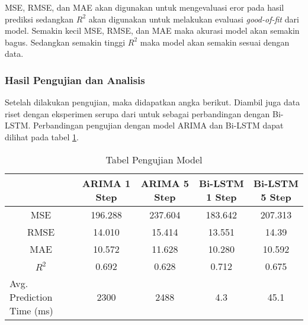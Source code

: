 MSE, RMSE, dan MAE akan digunakan untuk mengevaluasi eror pada hasil prediksi sedangkan $R^{2}$ akan digunakan untuk melakukan evaluasi \textit{good-of-fit} dari model. Semakin kecil MSE, RMSE, dan MAE maka akurasi model akan semakin bagus. Sedangkan semakin tinggi $R^{2}$ maka model akan semakin sesuai dengan data.

\subsubsection{Hasil Pengujian dan Analisis}

Setelah dilakukan pengujian, maka didapatkan angka berikut. Diambil juga data riset dengan eksperimen serupa dari \parencite{riset1} untuk sebagai perbandingan dengan Bi-LSTM. Perbandingan pengujian dengan model ARIMA dan Bi-LSTM  dapat dilihat pada tabel \ref{tab:pengujian-model-arima-bilstm}.

\begin{longtable}{|p{0.8in}|p{0.5in}|p{0.5in}|p{0.5in}|p{0.5in}|}

  \caption{Tabel Pengujian Model} \label{tab:pengujian-model-arima-bilstm}                                                                                                                                                                                   \\

  \hline
  \rowcolor{gray!30}\multicolumn{1}{|c|}{\textbf{Metrik}} & \multicolumn{1}{|c|}{\textbf{ARIMA 1 Step}} & \multicolumn{1}{|c|}{\textbf{ARIMA 5 Step}} & \multicolumn{1}{|c|}{\textbf{Bi-LSTM 1 Step}} & \multicolumn{1}{|c|}{\textbf{Bi-LSTM 5 Step}}        \\
  \hline
  \endfirsthead
  \endhead
  \multicolumn{1}{|c|}{MSE}                               & \multicolumn{1}{|c|}{196.288}               & \multicolumn{1}{|c|}{237.604}               & \multicolumn{1}{|c|}{183.642}                 & \multicolumn{1}{|c|}{207.313} \tabularnewline \hline

  \multicolumn{1}{|c|}{RMSE}                              & \multicolumn{1}{|c|}{14.010}                & \multicolumn{1}{|c|}{15.414}                & \multicolumn{1}{|c|}{13.551}                  & \multicolumn{1}{|c|}{14.39} \tabularnewline \hline

  \multicolumn{1}{|c|}{MAE}                               & \multicolumn{1}{|c|}{10.572}                & \multicolumn{1}{|c|}{11.628}                & \multicolumn{1}{|c|}{10.280}                  & \multicolumn{1}{|c|}{10.592} \tabularnewline \hline

  \multicolumn{1}{|c|}{$R^{2}$}                           & \multicolumn{1}{|c|}{0.692}                 & \multicolumn{1}{|c|}{0.628}                 & \multicolumn{1}{|c|}{0.712}                   & \multicolumn{1}{|c|}{0.675} \tabularnewline \hline

  Avg. Prediction Time (ms)                               & \multicolumn{1}{|c|}{2300}                  & \multicolumn{1}{|c|}{2488}                  & \multicolumn{1}{|c|}{4.3}                     & \multicolumn{1}{|c|}{45.1} \tabularnewline

  \hline
\end{longtable}

